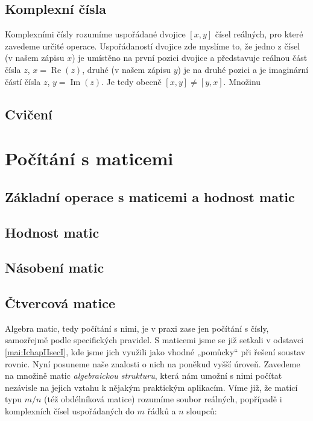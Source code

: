     \subsection{Komplexní čísla}
      Komplexními čísly rozumíme uspořádané dvojice \([x, y]\) čísel reálných, pro které zavedeme 
      určité operace. Uspořádaností dvojice zde myslíme to, že jedno z čísel (v našem zápisu \(x\)) 
      je umístěno na první pozici dvojice a představuje reálnou část čísla \(z\), \(x = 
      \operatorname{Re}(z)\), druhé (v našem zápisu \(y\)) je na druhé pozici a je imaginární částí 
      čísla \(z\), \(y = \operatorname{Im}(z)\). Je tedy obecně  \( [x, y] ≠ [y, x]\). Množinu
    \subsection{Cvičení}
  \section{Počítání s maticemi}\label{mai:IchapIIsecIII}
    \subsection{Základní operace s maticemi a hodnost matic}\label{mai:IchapIIsecIIIsubI}
    \subsection{Hodnost matic}\label{mai:IchapIIsecIIIsubII}
    \subsection{Násobení  matic}\label{mai:IchapIIsecIIIsubIII}
    \subsection{Čtvercová matice}\label{mai:IchapIIsecIIIsubIV}
    Algebra matic, tedy počítání s nimi, je v praxi zase jen počítání s čísly, samozřejmě podle
    specifických pravidel. S maticemi jsme se již setkali v odstavci \ref{mai:IchapIIsecI}, kde 
    jsme jich využili jako vhodné „pomůcky“ při řešení soustav rovnic. Nyní posuneme naše 
    znalosti o nich na poněkud vyšší úroveň. Zavedeme na množině matic \emph{algebraickou 
    strukturu}, která nám umožní s nimi počítat nezávisle na jejich vztahu k nějakým praktickým 
    aplikacím. Víme již, že maticí typu \(m/n\) (též obdélníková matice) rozumíme soubor reálných, 
    popřípadě i komplexních čísel uspořádaných do \(m\) řádků a \(n\) sloupců:
    
